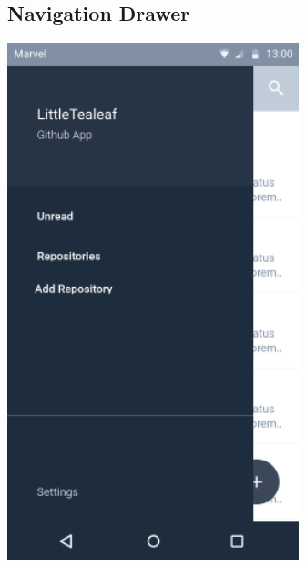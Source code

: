 \documentclass{report}
\begin{document}
\newpage
\subsection{Navigation Drawer}

\begin{center}
    \includegraphics[scale=0.6]{design-nav-drawer}
\end{center}

\newpage
\end{document}
